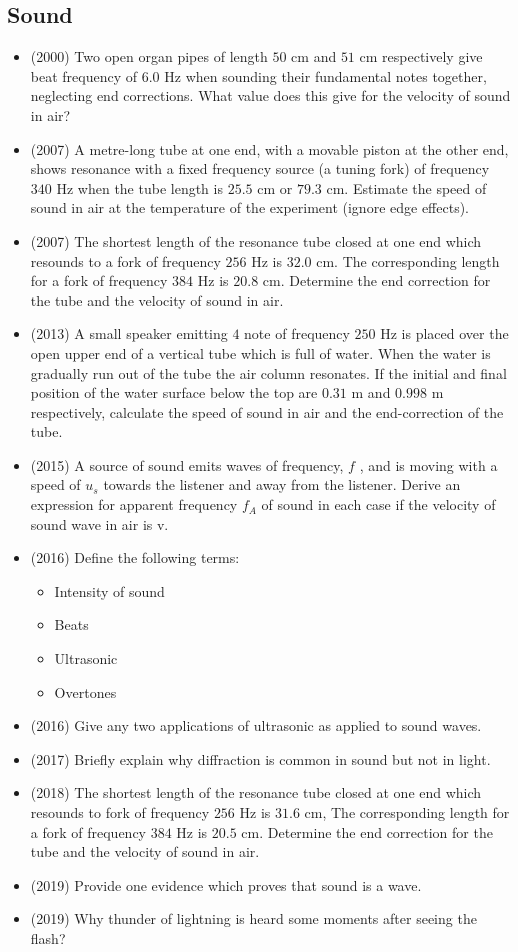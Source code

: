 \documentclass{article}
\begin{document}
\subsection{Sound}
\begin{itemize}
\item (2000)  Two open organ pipes of length $ 50$ cm and $ 51$ cm respectively give beat frequency of $ 6.0$ Hz when sounding their fundamental notes together, neglecting end corrections. What value does this give for the velocity of sound in air?
\item (2007)  A metre-long tube at one end, with a movable piston at the other end, shows resonance with a fixed frequency source (a tuning fork) of frequency $ 340$ Hz when the tube length is $ 25.5$ cm or $ 79.3$ cm.  Estimate the speed of sound in air at the temperature of the experiment (ignore edge effects).
\item (2007)  The shortest length of the resonance tube closed at one end which resounds to a fork of frequency $ 256$ Hz is $ 32.0$ cm.  The corresponding length for a fork of frequency $ 384$ Hz is $ 20.8$ cm.  Determine the end correction for the tube and the velocity of sound in air.
\item (2013)  A small speaker emitting $ 4$ note of frequency $ 250$ Hz is placed over the open upper end of a vertical tube which is full of water. When the water is gradually run out of the tube the air column resonates. If the initial and final position of the water surface below the top are $ 0.31$ m and $ 0.998$ m respectively, calculate the speed of sound in air and the end-correction of the tube. 
\item (2015)  A source of sound emits waves of frequency, $ f$ , and is moving with a speed of $ u_{s}$ towards the listener and away from the listener.  Derive an expression for apparent frequency $ f_{A}$ of sound in each case if the velocity of sound wave in air is v.  
\item (2016)  Define the following terms:
 \begin{itemize}
\item Intensity of sound
\item Beats
\item Ultrasonic
\item Overtones
\end{itemize}
\item (2016)  Give any two applications of ultrasonic as applied to sound waves.
\item (2017)  Briefly explain why diffraction is common in sound but not in light.
\item (2018)  The shortest length of the resonance tube closed at one end which resounds to fork of frequency $ 256$ Hz is $ 31.6$ cm, The corresponding length for a fork of frequency $ 384$ Hz is $ 20.5$ cm. Determine the end correction for the tube and the velocity of sound in air. 
\item (2019)  Provide one evidence which proves that sound is a wave.
\item (2019)  Why thunder of lightning is heard some moments after seeing the flash?
\end{itemize}
\end{document}
